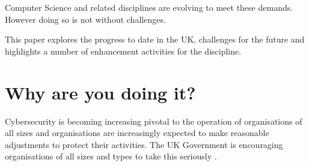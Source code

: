 \documentclass[sigconf]{acmart}
\begin{document}
Computer Science and related disciplines are evolving to meet these demands. However doing so is not without challenges. \begin{comment}If the UK computer science education community was to collectively address the challenges, it would facilitate improvements for how cybersecurity is taught. \end{comment}This paper explores the progress to date in the UK, challenges for the future and highlights a number of enhancement activities for the discipline.

\section {Why are you doing it?}	

\begin{comment}

\begin{quote}
	``{\emph{...[need to] change the culture in your organisation around cyber security; to try to do for cyber what has been done so successfully for health and safety, for example, over the last ten years --- to get everybody to take it seriously; to take the risk management process seriously and drive that down through the organisation.}}''\\
	\hfill Robert Hannigan~\cite{Hannigan2019a}, former Director of GCHQ
\end{quote}

\end{comment}

Cybersecurity is becoming increasing pivotal to the operation of organisations of all sizes and organisations are increasingly expected to make reasonable adjustments to protect their activities. The UK Government is encouraging organisations of all sizes and types to take this seriously \cite{Hannigan2019a}. 

\begin{comment}

This need to build knowledge, skills and capacity in the area of cybersecurity has also led to the establishment of a number of strategic policy initiatives from a number of national governments, for example the publication in 2016 of the UK's Cyber Security Strategy~\cite{ukcyberstrategy:2016} (along with the setting up of the National Cyber Security Centre, as well as increased scrutiny of the resilience of the UK's critical national infrastructure~\cite{lordscyberreport:2018}; also industry-focused initiatives such as Cyber Essentials~\cite{ncsc2017ce}, the EU Cybersecurity Act~\cite{eucyber2018} (which reinforces the mandate of the EU Agency for Cybersecurity: ENISA, the European Union Agency for Network and Information and Security), or the National Initiative for Cybersecurity Education (NICE) in the USA~\cite{NICE}.

\end{comment}
\end{document}

